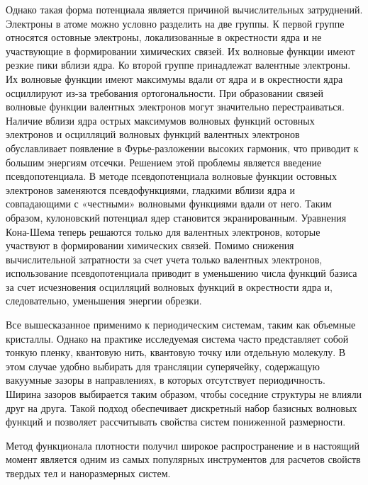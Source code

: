 Однако такая форма потенциала является причиной вычислительных затруднений.  Электроны в атоме можно условно разделить на две группы. К первой группе относятся остовные электроны, локализованные в окрестности ядра и не участвующие в формировании химических связей. Их волновые функции имеют резкие пики вблизи ядра. Ко второй группе принадлежат валентные электроны. Их волновые функции имеют максимумы вдали от ядра и в окрестности ядра осциллируют из-за требования ортогональности.  При образовании связей волновые функции валентных электронов могут значительно перестраиваться. Наличие вблизи ядра острых максимумов волновых функций остовных электронов и осцилляций волновых функций валентных электронов обуславливает появление в Фурье-разложении высоких гармоник, что приводит к большим энергиям отсечки. Решением этой проблемы является введение псевдопотенциала. В методе псевдопотенциала волновые функции остовных электронов заменяются псевдофункциями, гладкими вблизи ядра и совпадающими с «честными» волновыми функциями вдали от него. Таким образом, кулоновский потенциал ядер становится экранированным. Уравнения Кона-Шема теперь решаются только для валентных электронов, которые участвуют в формировании химических связей. Помимо снижения вычислительной затратности за счет учета только валентных электронов, использование псевдопотенциала приводит в уменьшению числа функций базиса за счет исчезновения осцилляций волновых функций в окрестности ядра и, следовательно, уменьшения энергии обрезки.
	
	Все вышесказанное применимо к периодическим системам, таким как объемные кристаллы. Однако на практике исследуемая система часто представляет собой тонкую пленку, квантовую нить, квантовую точку или отдельную молекулу. В этом случае удобно выбирать для трансляции суперячейку, содержащую вакуумные зазоры в направлениях, в которых отсутствует периодичность. Ширина зазоров выбирается таким образом, чтобы соседние структуры не влияли друг на друга. Такой подход обеспечивает дискретный набор базисных волновых функций и позволяет рассчитывать свойства систем пониженной размерности.

Метод функционала плотности получил широкое распространение и в настоящий момент является одним из самых популярных инструментов для расчетов свойств твердых тел и наноразмерных систем.


